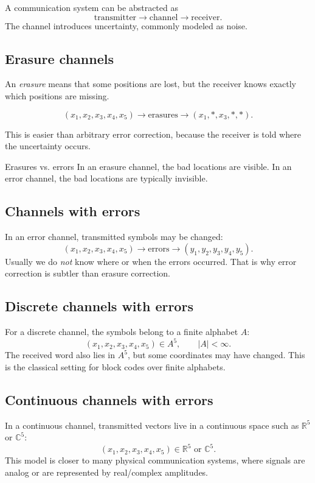 \documentclass[11pt]{article}
\begin{document}
A communication system can be abstracted as
\[
\text{transmitter} \longrightarrow \text{channel} \longrightarrow \text{receiver}.
\]
The channel introduces uncertainty, commonly modeled as noise.

\subsection{Erasure channels}

An \emph{erasure} means that some positions are lost, but the receiver knows exactly
which positions are missing.

\[
(x_1,x_2,x_3,x_4,x_5) \longrightarrow \text{erasures} \longrightarrow (x_1,\ast,x_3,\ast,\ast).
\]

This is easier than arbitrary error correction, because the receiver is told where the
uncertainty occurs.

\begin{summarybox}{Erasures vs. errors}
In an erasure channel, the bad locations are visible. In an error channel, the bad
locations are typically invisible.
\end{summarybox}

\subsection{Channels with errors}

In an error channel, transmitted symbols may be changed:
\[
(x_1,x_2,x_3,x_4,x_5) \longrightarrow \text{errors} \longrightarrow (y_1,y_2,y_3,y_4,y_5).
\]
Usually we do \emph{not} know where or when the errors occurred. That is why error
correction is subtler than erasure correction.

\subsection{Discrete channels with errors}

For a discrete channel, the symbols belong to a finite alphabet $A$:
\[
(x_1,x_2,x_3,x_4,x_5) \in A^5, \qquad |A| < \infty.
\]
The received word also lies in $A^5$, but some coordinates may have changed.
This is the classical setting for block codes over finite alphabets.

\subsection{Continuous channels with errors}

In a continuous channel, transmitted vectors live in a continuous space such as
$\mathbb{R}^5$ or $\mathbb{C}^5$:
\[
(x_1,x_2,x_3,x_4,x_5) \in \mathbb{R}^5 \text{ or } \mathbb{C}^5.
\]
This model is closer to many physical communication systems, where signals are analog
or are represented by real/complex amplitudes.
\end{document}
